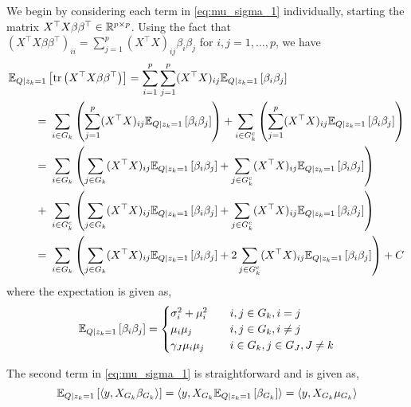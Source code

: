 We begin by considering each term in \eqref{eq:mu_sigma_1} individually, starting the matrix $ X^\top X \beta \beta^\top \in \mathbb{R}^{p \times p} $. Using the fact that $\left( X^\top X \beta \beta^\top \right)_{ii} = \sum_{j=1}^{p} (X^\top X)_{ij} \beta_i \beta_j $ for $i,j = 1, \dots, p$, we have
\begin{align}
    \E_{Q | z_k = 1} & \left[ 
	\tr \left( X^\top X \beta \beta^\top \right) 
    \right]
=
    \sum_{i=1}^p \sum_{j=1}^{p} (X^\top X)_{ij} 
    \E_{Q | z_k = 1} \left[ \beta_i \beta_j \right] 
    \nonumber \\
=&\
    \sum_{i \in G_k} \left(
	\sum_{j=1}^{p} (X^\top X)_{ij} 
	\E_{Q | z_k = 1} \left[ \beta_i \beta_j \right]
    \right)
+
    \sum_{i \in G_k^c} \left(
	\sum_{j=1}^{p} (X^\top X)_{ij} 
	\E_{Q | z_k = 1} \left[ \beta_i \beta_j \right] 
    \right)
    \nonumber \\
=&\
    \sum_{i \in G_k} \left( 
	\sum_{j \in G_k} (X^\top X)_{ij} 
	    \E_{Q | z_k = 1} \left[ \beta_i \beta_j \right] 
	+ 
	\sum_{j \in G_k^c} (X^\top X)_{ij} 
	    \E_{Q | z_k = 1} \left[ \beta_i \beta_j \right] 
    \right ) \nonumber \\
+&\ 
    \sum_{i \in G_k^c} \left( 
	\sum_{j \in G_k} (X^\top X)_{ij} 
	    \E_{Q | z_k = 1} \left[ \beta_i \beta_j \right] 
	+ 
	\sum_{j \in G_k^c} (X^\top X)_{ij} 
	    \E_{Q | z_k = 1} \left[ \beta_i \beta_j \right] 
    \right ) \nonumber \\
=&\
    \sum_{i \in G_k} \left( 
	\sum_{j \in G_k} (X^\top X)_{ij} 
	    \E_{Q | z_k = 1} \left[ \beta_i \beta_j \right] 
	+ 
	2 \sum_{j \in G_k^c} (X^\top X)_{ij} 
	    \E_{Q | z_k = 1} \left[ \beta_i \beta_j \right] 
    \right ) + C \nonumber
\end{align}
where the expectation is given as,
\begin{equation}
    \mathbb{E}_{Q | z_k = 1} \left[ \beta_i \beta_j \right] = \begin{cases}
	\sigma_{i}^2 + \mu_{i}^2 	& \quad i,j \in G_k, i=j \\
	\mu_{i}\mu_{j} 			& \quad i,j \in G_k, i \neq j \\
	\gamma_J \mu_{i}\mu_{j} 	& \quad i \in G_k, j \in G_J, J \neq k
    \end{cases}
\end{equation}

The second term in \eqref{eq:mu_sigma_1} is straightforward and is given as,
\begin{equation} \label{eq:mu_sigma_term_2}
    \mathbb{E}_{Q | z_k = 1} \left[ \langle y, X_{G_k} \beta_{G_k} \rangle  \right]
=   
    \langle y, X_{G_k} \mathbb{E}_{Q | z_k = 1} \left[ \beta_{G_k} \right] \rangle   
=
    \langle y, X_{G_k} \mu_{G_k} \rangle  
\end{equation}

